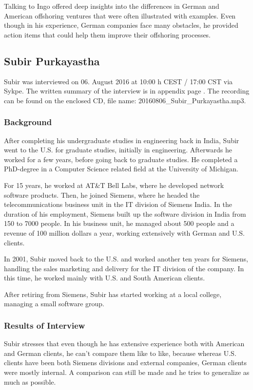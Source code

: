 Talking to Ingo offered deep insights into the differences in German and American offshoring ventures that were often illustrated with examples. Even though in his experience, German companies face many obstacles, he provided action items that could help them improve their offshoring processes.

\subsection{Subir Purkayastha} %
Subir was interviewed on 06. August 2016 at 10:00 h CEST / 17:00 CST via Sykpe. The written summary of the interview is in appendix page \pageref{int:Subir}. The recording can be found on the enclosed CD, file name: 20160806\_Subir\_Purkayastha.mp3.

\subsubsection{Background}

After completing his undergraduate studies in engineering back in India, Subir went to the U.S. for graduate studies, initially in engineering. Afterwards he worked for a few years, before going back to graduate studies. He completed a PhD-degree in a Computer Science related field at the University of Michigan.

For 15 years, he worked at AT\&T Bell Labs, where he developed network software products. Then, he joined Siemens, where he headed the telecommunications business unit in the IT division of Siemens India. In the duration of his employment, Siemens built up the software division in India from 150 to 7000 people. In his business unit, he managed about 500 people and a revenue of 100 million dollars a year, working extensively with German and U.S. clients.

In 2001, Subir moved back to the U.S. and worked another ten years for Siemens, handling the sales marketing and delivery for the IT division of the company. In this time, he worked mainly with U.S. and South American clients.

After retiring from Siemens, Subir has started working at a local college, managing a small software group.

\subsubsection{Results of Interview}

Subir stresses that even though he has extensive experience both with American and German clients, he can't compare them like to like, because whereas U.S. clients have been both Siemens divisions and external companies, German clients were mostly internal. A comparison can still be made and he tries to generalize as much as possible.

